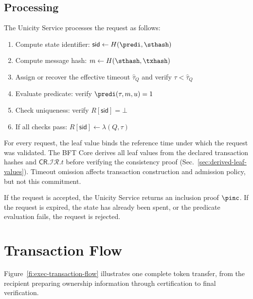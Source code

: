 \subsection{Processing}\label{sec:us-processing}

The Unicity Service processes the request as follows:
\begin{enumerate}
	\item Compute state identifier: $\mathsf{sid} \gets H(\predi, \sthash)$
	\item Compute message hash: $m \gets H(\sthash, \txhash)$
	\item Assign or recover the effective timeout $\widehat\tau_Q$ and verify $\tau < \widehat\tau_Q$
	\item Evaluate predicate: verify $\predi(\tau, m, u) = 1$
	\item Check uniqueness: verify $R[\mathsf{sid}] = \bot$
	\item If all checks pass: $R[\mathsf{sid}] \gets \lambda(Q,\tau)$
\end{enumerate}

For every request, the leaf value binds the reference time under which the request was validated. The BFT Core derives all leaf values from the declared transaction hashes and $\mathsf{CR}.\mathcal{IR}.t$ before verifying the consistency proof (Sec.~\ref{sec:derived-leaf-values}). Timeout omission affects transaction construction and admission policy, but not this commitment.

If the request is accepted, the Unicity Service returns an inclusion proof $\pinc$. If the request is expired, the state has already been spent, or the predicate evaluation fails, the request is rejected.


\section{Transaction Flow}\label{sec:transaction-flow}

Figure~\ref{fi:exec-transaction-flow} illustrates one complete token transfer, from the recipient preparing ownership information through certification to final verification.

